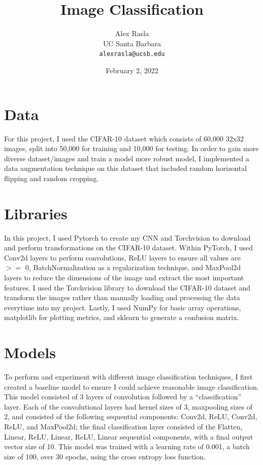 \documentclass[11pt,a4paper]{article}
\title{Image Classification}
\author{Alex Rasla \\
  UC Santa Barbara \\
  \texttt{alexrasla@ucsb.edu}}
\date{February 2, 2022}
\begin{document}
\maketitle

\section{Data}

For this project, I used the CIFAR-10 \cite{Krizhevsky09learningmultiple} dataset which consists of 60,000 32x32 images, 
 split into 50,000 for training and 10,000 for testing. In order to gain more diverse dataset/images
  and train a model more robust model, I implemented a data augmentation technique on this dataset that
  included random horizontal flipping and random cropping.

\section{Libraries}

In this project, I used Pytorch to create my CNN and Torchvision to download and perform transformations on the CIFAR-10 dataset.
 Within PyTorch, I used Conv2d layers to perform convolutions, ReLU layers to ensure all values are $>=$ 0, BatchNormalization as a 
 regularization technique, and MaxPool2d layers to reduce the dimensions of the image and extract the most important features. I used the 
 Torchvision library to download the CIFAR-10 dataset and transform the images rather than manually loading and 
 processing the data everytime into my project. Lastly, I used NumPy for basic array operations, matplotlib for
  plotting metrics, and sklearn to generate a confusion matrix.


\section{Models}
To perform and experiment with different image classification techniques, I first created a baseline model to ensure I could 
achieve reasonable image classification. This model consisted of 3 layers of convolution followed by a “classification” layer. 
Each of the convolutional layers had kernel sizes of 3, maxpooling sizes of 2, and consisted of the following sequential components: 
Conv2d, ReLU, Conv2d, ReLU, and MaxPool2d; the final classification layer consisted of the Flatten, Linear, ReLU, Linear, ReLU, 
Linear sequential components, with a final output vector size of 10. This model was trained with a learning rate of 0.001, a batch size of 100, 
over 30 epochs, using the cross entropy loss function.
\end{document}
